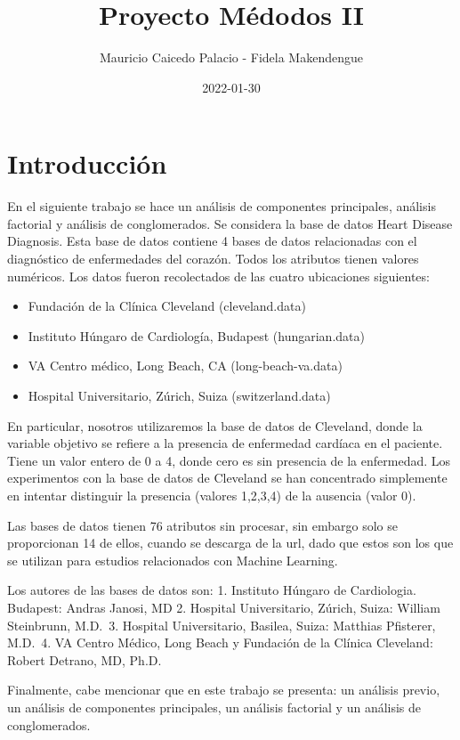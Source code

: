 \documentclass[
]{article}
\title{Proyecto Médodos II}
\author{Mauricio Caicedo Palacio - Fidela Makendengue}
\date{2022-01-30}
\begin{document}
\maketitle

\hypertarget{introducciuxf3n}{%
\section{Introducción}\label{introducciuxf3n}}

En el siguiente trabajo se hace un análisis de componentes principales,
análisis factorial y análisis de conglomerados. Se considera la base de
datos Heart Disease Diagnosis. Esta base de datos contiene 4 bases de
datos relacionadas con el diagnóstico de enfermedades del corazón. Todos
los atributos tienen valores numéricos. Los datos fueron recolectados de
las cuatro ubicaciones siguientes:

\begin{itemize}
\item
  Fundación de la Clínica Cleveland (cleveland.data)
\item
  Instituto Húngaro de Cardiología, Budapest (hungarian.data)
\item
  VA Centro médico, Long Beach, CA (long-beach-va.data)
\item
  Hospital Universitario, Zúrich, Suiza (switzerland.data)
\end{itemize}

En particular, nosotros utilizaremos la base de datos de Cleveland,
donde la variable objetivo se refiere a la presencia de enfermedad
cardíaca en el paciente. Tiene un valor entero de 0 a 4, donde cero es
sin presencia de la enfermedad. Los experimentos con la base de datos de
Cleveland se han concentrado simplemente en intentar distinguir la
presencia (valores 1,2,3,4) de la ausencia (valor 0).

Las bases de datos tienen 76 atributos sin procesar, sin embargo solo se
proporcionan 14 de ellos, cuando se descarga de la url, dado que estos
son los que se utilizan para estudios relacionados con Machine Learning.

Los autores de las bases de datos son: 1. Instituto Húngaro de
Cardiologia. Budapest: Andras Janosi, MD 2. Hospital Universitario,
Zúrich, Suiza: William Steinbrunn, M.D.~3. Hospital Universitario,
Basilea, Suiza: Matthias Pfisterer, M.D.~4. VA Centro Médico, Long Beach
y Fundación de la Clínica Cleveland: Robert Detrano, MD, Ph.D.

Finalmente, cabe mencionar que en este trabajo se presenta: un análisis
previo, un análisis de componentes principales, un análisis factorial y
un análisis de conglomerados.
\end{document}

